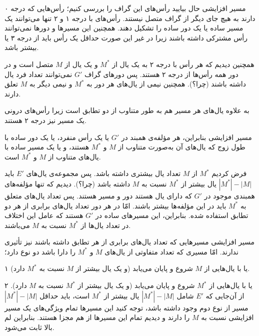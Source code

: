 \begin{itemframe}{مسیر افزایشی}
\itm
حال بیایید رأس‌های این گراف را بررسی کنیم؛ رأس‌هایی که درجه ۰ دارند به هیچ جای دیگر از گراف متصل نیستند. رأس‌های با درجه ۱ و ۲ تنها می‌توانند یک مسیر ساده یا یک دور ساده را تشکیل دهند. همچنین این مسیرها و دور‌ها نمی‌توانند رأس مشترکی داشته باشند زیرا در غیر این صورت حداقل یک رأس باید از درجه ۳ یا بیشتر باشد.

\itm
همچنین دیدیم که هر رأس با درجه ۲ به یک یال از $M^*$ و یک یال از $M$ متصل است و در دور همه رأس‌ها از درجه ۲ هستند. پس دورهای گراف $G'$ نمی‌توانند تعداد فرد یال داشته باشند (چرا؟). همچنین نیمی از یال‌های هر دور به $M^*$ و نیمی دیگر به $M$ تعلق دارند.

\itm
به علاوه یال‌های هر مسیر هم به طور متناوب از دو تطابق است زیرا رأس‌های درونی یک مسیر نیز درجه ۲ هستند.

\end{itemframe}

\begin{itemframe}{مسیر افزایشی}
\itm
بنابراین، هر مؤلفه‌ی همبند در $G'$ یا یک رأس منفرد، یا یک دور ساده با طول زوج که یال‌های آن به‌صورت متناوب از $M$ و $M^*$ هستند، و یا یک مسیر ساده با یال‌های متناوب از $M$ و $M^*$ است.

\itm
فرض کردیم  $M^*$ از $M$ تعداد یال بیشتری داشته باشد.
پس مجموعه‌ی یال‌های $E'$ باید $|M^*| - |M|$ یال بیشتر از $M^*$ نسبت به $M$ داشته باشد (چرا؟).
\itm
دیدیم که تنها مؤلفه‌های همبندی موجود در $G'$ که دارای یال ‌هستند دور و مسیر هستند. پس تعداد یال‌های متعلق به $M^*$ باید در این مؤلفه‌ها بیشتر باشند. امّا در هر دور تعداد یال‌های برابری از هر دو تطابق استفاده شده. بنابراین، این مسیرهای ساده در $G'$ هستند که عامل این اختلاف در تعداد یال‌ها از $M^*$ نسبت به $M$ می‌باشند.

\end{itemframe}

\begin{itemframe}{مسیر افزایشی}
\itm
مسیرهایی که تعداد یال‌های برابری از هر تطابق داشته باشند نیز تأثیری ندارند. امّا مسیری که تعداد متفاوتی از یال‌های $M$ و $M^*$ را دارا باشد دو نوع دارد؛
\item[۱]
یا با یال‌هایی از $M$ شروع و پایان می‌یابد (و یک یال بیشتر از $M$ نسبت به $M^*$ دارد).
\item[۲]
یا با یال‌هایی از $M^*$ شروع و پایان می‌یابد (و یک یال بیشتر از $M^*$ نسبت به $M$ دارد).
\itm
از آن‌جایی که $E'$ شامل $|M^*| - |M|$ یال بیشتر از $M^*$ است، باید حداقل $|M^*| - |M|$ مسیر از نوع دوم وجود داشته باشد، توجه کنید این مسیرها تمام ویژگی‌های یک مسیر افزایشی نسبت به $M$ را دارند و دیدیم تمام این مسیرها از هم مجزا هستند. بنابراین لم بالا ثابت می‌شود.
\end{itemframe}


